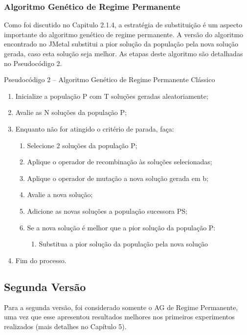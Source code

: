 \subsubsection{Algoritmo Genético de Regime Permanente}

Como foi discutido no Capitulo 2.1.4, a estratégia de substituição é um aspecto importante do algoritmo genético de regime permanente. A versão do algoritmo encontrado no JMetal substitui a pior solução da população pela nova solução gerada, caso esta solução seja melhor. As etapas deste algoritmo são detalhadas no Pseudocódigo 2.

Pseudocódigo 2 – Algoritmo Genético de Regime Permanente Clássico

\begin{enumerate}
\item Inicialize a população P com T soluções geradas aleatoriamente;
\item Avalie as N soluções da população P;
\item Enquanto não for atingido o critério de parada, faça:

\begin{enumerate}

\item Selecione 2 soluções da população P;
\item Aplique o operador de recombinação às soluções selecionadas;
\item Aplique o operador de mutação a nova solução gerada em b;

\item Avalie a nova solução;
\item Adicione as novas soluções a população sucessora PS;
\item Se a nova solução é melhor que a pior solução da população P:
\begin{enumerate}
\item Substitua a pior solução da população pela nova solução	
\end{enumerate}

\end{enumerate}
\item Fim do processo.

\end{enumerate}

\subsection{Segunda Versão}

Para a segunda versão, foi considerado somente o AG de Regime Permanente, uma vez que esse apresentou resultados melhores nos primeiros experimentos realizados (mais detalhes no Capítulo 5). 

